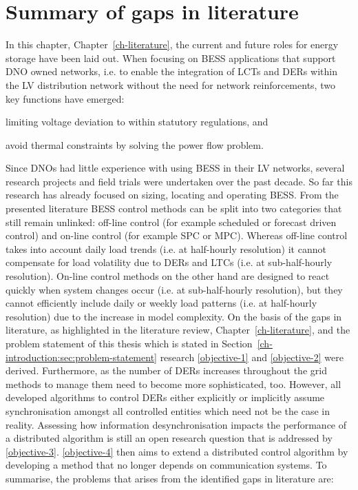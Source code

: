 \section{Summary of gaps in literature}
\label{ch-literature:sec:literature-gaps}

In this chapter, Chapter~\ref{ch-literature}, the current and future roles for energy storage have been laid out.
When focusing on BESS applications that support DNO owned networks, i.e. to enable the integration of LCTs and DERs within the LV distribution network without the need for network reinforcements, two key functions have emerged:
\begin{enumerate*}
	\item limiting voltage deviation to within statutory regulations, and
	\item avoid thermal constraints by solving the power flow problem.
\end{enumerate*}
Since DNOs had little experience with using BESS in their LV networks, several research projects and field trials were undertaken over the past decade.
So far this research has already focused on sizing, locating and operating BESS.
From the presented literature BESS control methods can be split into two  categories that still remain unlinked: off-line control (for example scheduled or forecast driven control) and on-line control (for example SPC or MPC).
Whereas off-line control takes into account daily load trends (i.e. at half-hourly resolution) it cannot compensate for load volatility due to DERs and LTCs (i.e. at sub-half-hourly resolution).
On-line control methods on the other hand are designed to react quickly when system changes occur (i.e. at sub-half-hourly resolution), but they cannot efficiently include daily or weekly load patterns (i.e. at half-hourly resolution) due to the increase in model complexity.
On the basis of the gaps in literature, as highlighted in the literature review, Chapter~\ref{ch-literature}, and the problem statement of this thesis which is stated in Section~\ref{ch-introduction:sec:problem-statement} research \ref{objective-1} and \ref{objective-2} were derived.
Furthermore, as the number of DERs increases throughout the grid methods to manage them need to become more sophisticated, too.
However, all developed algorithms to control DERs either explicitly or implicitly assume synchronisation amongst all controlled entities which need not be the case in reality.
Assessing how information desynchronisation impacts the performance of a distributed algorithm is still an open research question that is addressed by \ref{objective-3}.
\ref{objective-4} then aims to extend a distributed control algorithm by developing a method that no longer depends on communication systems.
To summarise, the problems that arises from the identified gaps in literature are:

